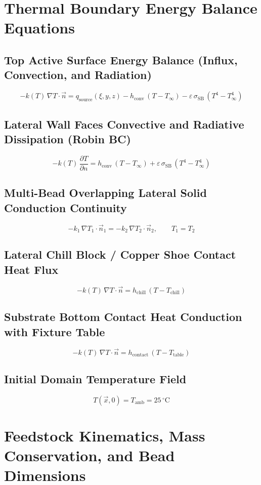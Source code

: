 \documentclass[10pt,a4paper]{article}
\begin{document}
\clearpage
\section{Thermal Boundary Energy Balance Equations}

\subsection*{Top Active Surface Energy Balance (Influx, Convection, and Radiation)}
\[
-k(T)\,\nabla T \cdot \vec{n} = q_{\mathrm{source}}(\xi, y, z) - h_{\mathrm{conv}}\,(T - T_\infty) - \varepsilon\,\sigma_{\mathrm{SB}}\,(T^4 - T_\infty^4)
\]

\subsection*{Lateral Wall Faces Convective and Radiative Dissipation (Robin BC)}
\[
-k(T)\,\frac{\partial T}{\partial n} = h_{\mathrm{conv}}\,(T - T_\infty) + \varepsilon\,\sigma_{\mathrm{SB}}\,(T^4 - T_\infty^4)
\]

\subsection*{Multi-Bead Overlapping Lateral Solid Conduction Continuity}
\[
-k_1\,\nabla T_1 \cdot \vec{n}_1 = -k_2\,\nabla T_2 \cdot \vec{n}_2, \qquad T_1 = T_2
\]

\subsection*{Lateral Chill Block / Copper Shoe Contact Heat Flux}
\[
-k(T)\,\nabla T \cdot \vec{n} = h_{\mathrm{chill}}\,(T - T_{\mathrm{chill}})
\]

\subsection*{Substrate Bottom Contact Heat Conduction with Fixture Table}
\[
-k(T)\,\nabla T \cdot \vec{n} = h_{\mathrm{contact}}\,(T - T_{\mathrm{table}})
\]

\subsection*{Initial Domain Temperature Field}
\[
T(\vec{x}, 0) = T_{\mathrm{amb}} = 25\,^\circ\mathrm{C}
\]

\clearpage
\section{Feedstock Kinematics, Mass Conservation, and Bead Dimensions}
\end{document}
